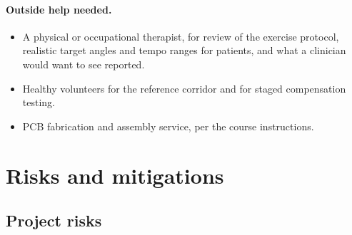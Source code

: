 \documentclass[11pt]{article}
\begin{document}
\paragraph{Outside help needed.}
\begin{itemize}
\item A physical or occupational therapist, for review of the exercise protocol,
realistic target angles and tempo ranges for patients, and what a clinician
would want to see reported.
\item Healthy volunteers for the reference corridor and for staged compensation
testing.
\item PCB fabrication and assembly service, per the course instructions.
\end{itemize}

\section{Risks and mitigations}

\subsection{Project risks}
\end{document}
